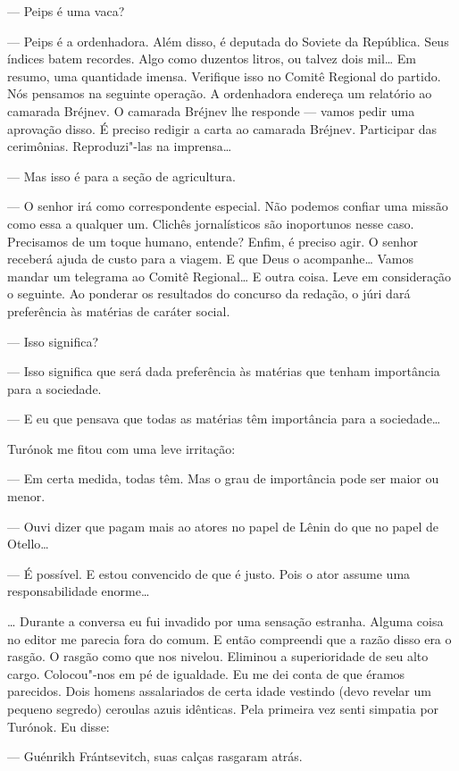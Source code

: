 --- Peips é uma vaca?

--- Peips é a ordenhadora. Além disso, é deputada do Soviete da
República. Seus índices batem recordes. Algo como duzentos litros, ou
talvez dois mil\ldots{} Em resumo, uma quantidade imensa. Verifique isso no
Comitê Regional do partido. Nós pensamos na seguinte operação. A
ordenhadora endereça um relatório ao camarada Bréjnev. O camarada
Bréjnev lhe responde --- vamos pedir uma aprovação disso. É
preciso redigir a carta ao camarada Bréjnev. Participar das cerimônias.
Reproduzi"-las na imprensa\ldots{}

--- Mas isso é para a seção de agricultura.

--- O senhor irá como correspondente especial. Não podemos
confiar uma missão como essa a qualquer um. Clichês jornalísticos são
inoportunos nesse caso. Precisamos de um toque humano, entende? Enfim, é
preciso agir. O senhor receberá ajuda de custo para a viagem. E que Deus
o acompanhe\ldots{} Vamos mandar um telegrama ao Comitê Regional\ldots{} E outra
coisa. Leve em consideração o seguinte. Ao ponderar os resultados do
concurso da redação, o júri dará preferência às matérias de caráter
social.

--- Isso significa?

--- Isso significa que será dada preferência às matérias que
tenham importância para a sociedade.

--- E eu que pensava que todas as matérias têm importância para a
sociedade\ldots{}

Turónok me fitou com uma leve irritação:

--- Em certa medida, todas têm. Mas o grau de importância pode
ser maior ou menor.

--- Ouvi dizer que pagam mais ao atores no papel de Lênin do que
no papel de Otello\ldots{}

--- É possível. E estou convencido de que é justo. Pois o ator
assume uma responsabilidade enorme\ldots{}

\ldots{} Durante a conversa eu fui invadido por uma sensação estranha. Alguma
coisa no editor me parecia fora do comum. E então compreendi que a razão
disso era o rasgão. O rasgão como que nos nivelou. Eliminou a
superioridade de seu alto cargo. Colocou"-nos em pé de igualdade. Eu me
dei conta de que éramos parecidos. Dois homens assalariados de certa
idade vestindo (devo revelar um pequeno segredo) ceroulas azuis
idênticas. Pela primeira vez senti simpatia por Turónok. Eu disse:

--- Guénrikh Frántsevitch, suas calças rasgaram atrás.

